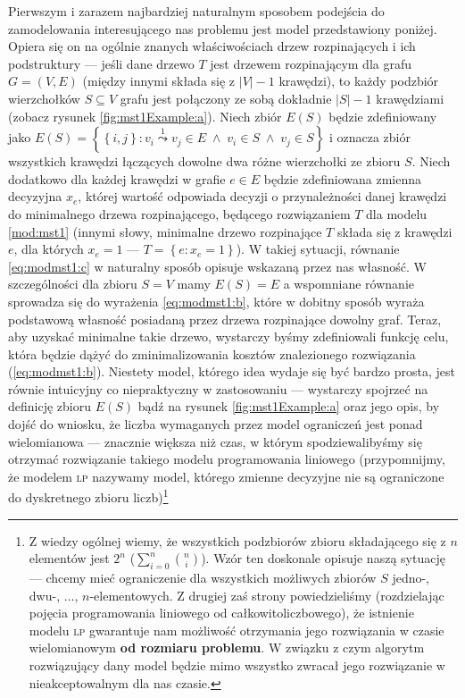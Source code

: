 Pierwszym i zarazem najbardziej naturalnym sposobem podejścia do zamodelowania interesującego nas problemu jest model przedstawiony poniżej. Opiera się on na ogólnie znanych właściwościach drzew rozpinających i ich podstruktury --- jeśli dane drzewo $T$ jest drzewem rozpinającym dla grafu $G = \left( V, E \right)$ (między innymi składa się z $\left| V \right| - 1$ krawędzi), to każdy podzbiór wierzchołków $S \subseteq V$ grafu jest połączony ze sobą dokładnie $\left| S \right| - 1$ krawędziami (zobacz rysunek \ref{fig:mst1Example:a}). Niech zbiór $E \left( S \right)$ będzie zdefiniowany jako $E \left( S \right) = \left\{ \left\{ i, j \right\} : v_{i} \overset{1}\leadsto v_{j} \in E \; \wedge \; v_{i} \in S \; \wedge \; v_{j} \in S \right\}$ i oznacza zbiór wszystkich krawędzi łączących dowolne dwa różne wierzchołki ze zbioru $S$. Niech dodatkowo dla każdej krawędzi w grafie $e \in E$ będzie zdefiniowana zmienna decyzyjna $x_{e}$, której wartość odpowiada decyzji o przynależności danej krawędzi do minimalnego drzewa rozpinającego, będącego rozwiązaniem $T$ dla modelu \ref{mod:mst1} (innymi słowy, minimalne drzewo rozpinające $T$ składa się z krawędzi $e$, dla których $x_{e} = 1$ --- $T = \left\{ e : x_{e} = 1 \right\}$). W takiej sytuacji, równanie \ref{eq:modmst1:c} w naturalny sposób opisuje wskazaną przez nas własność. W szczególności dla zbioru $S = V$ mamy $E \left( S \right) = E$ a wspomniane równanie sprowadza się do wyrażenia \ref{eq:modmst1:b}, które w dobitny sposób wyraża podstawową własność posiadaną przez drzewa rozpinające dowolny graf. Teraz, aby uzyskać minimalne takie drzewo, wystarczy byśmy zdefiniowali funkcję celu, która będzie dążyć do zminimalizowania kosztów znalezionego rozwiązania (\ref{eq:modmst1:b}). Niestety model, którego idea wydaje się być bardzo prosta, jest równie intuicyjny co niepraktyczny w zastosowaniu --- wystarczy spojrzeć na definicję zbioru $E \left( S \right)$ bądź na rysunek \ref{fig:mst1Example:a} oraz jego opis, by dojść do wniosku, że liczba wymaganych przez model ograniczeń jest ponad wielomianowa --- znacznie większa niż czas, w którym spodziewalibyśmy się otrzymać rozwiązanie takiego modelu programowania liniowego (przypomnijmy, że modelem \textsc{lp} nazywamy model, którego zmienne decyzyjne nie są ograniczone do dyskretnego zbioru liczb)\footnote{Z wiedzy ogólnej wiemy, że wszystkich podzbiorów zbioru składającego się z $n$ elementów jest $2^{n}$ ($\sum_{i=0}^{n} \binom{n}{i}$). Wzór ten doskonale opisuje naszą sytuację --- chcemy mieć ograniczenie dla wszystkich możliwych zbiorów $S$ jedno-, dwu-, $\dots$, $n$-elementowych. Z drugiej zaś strony powiedzieliśmy (rozdzielając pojęcia programowania liniowego od całkowitoliczbowego), że istnienie modelu \textsc{lp} gwarantuje nam możliwość otrzymania jego rozwiązania w czasie wielomianowym \textbf{od rozmiaru problemu}. W związku z czym algorytm rozwiązujący dany model będzie mimo wszystko zwracał jego rozwiązanie w nieakceptowalnym dla nas czasie.}

